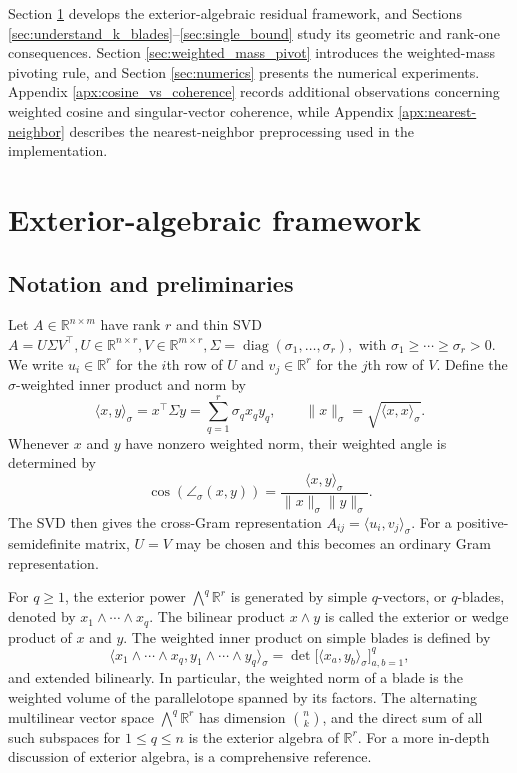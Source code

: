 \documentclass[11pt, preprint]{article}
\newcommand{\R}{\mathbb{R}}
\newcommand{\inner}[1]{\langle #1\rangle}
\begin{document}
Section \ref{sec:all_theory} develops the exterior-algebraic residual
framework, and Sections \ref{sec:understand_k_blades}--\ref{sec:single_bound}
study its geometric and rank-one consequences. Section
\ref{sec:weighted_mass_pivot} introduces the weighted-mass pivoting rule, and
Section \ref{sec:numerics} presents the numerical experiments. Appendix
\ref{apx:cosine_vs_coherence} records additional observations concerning
weighted cosine and singular-vector coherence, while Appendix
\ref{apx:nearest-neighbor} describes the nearest-neighbor preprocessing used
in the implementation.

\section{Exterior-algebraic framework}\label{sec:all_theory}

\subsection{Notation and preliminaries}\label{sec:main_res_and_prelim}

Let $A\in\R^{n\times m}$ have rank $r$ and thin SVD \( A=U\Sigma V^\top, U\in\R^{n\times r},V\in\R^{m\times r},\Sigma=\operatorname{diag}(\sigma_1,\ldots,\sigma_r), \)
with $\sigma_1\geq\cdots\geq\sigma_r>0$. We write $u_i\in\R^r$ for the $i$th row of $U$ and $v_j\in\R^r$ for the $j$th row of $V$. Define the $\sigma$-weighted inner product and norm by
\[
\inner{x,y}_\sigma=x^\top\Sigma y
=\sum_{q=1}^r\sigma_qx_qy_q,
\qquad
\|x\|_\sigma=\sqrt{\inner{x,x}_\sigma}.
\]
Whenever $x$ and $y$ have nonzero weighted norm, their weighted angle is determined by
\[
\cos(\angle_\sigma(x,y))
=\frac{\inner{x,y}_\sigma}{\|x\|_\sigma\|y\|_\sigma}.
\]
The SVD then gives the cross-Gram representation
\(
A_{ij}=\inner{u_i,v_j}_\sigma.
\) 
For a positive-semidefinite matrix, $U=V$ may be chosen and this becomes an ordinary Gram representation.

For $q\geq1$, the exterior power $\bigwedge^q\R^r$ is generated by simple $q$-vectors, or $q$-blades, denoted by \(x_1\wedge\cdots\wedge x_q.\) 
The bilinear product $x\wedge y$ is called the exterior or wedge product of $x$ and $y$. The weighted inner product on simple blades is defined by
\[
\inner{x_1\wedge\cdots\wedge x_q,
       y_1\wedge\cdots\wedge y_q}_\sigma
=
\det\!\big[\inner{x_a,y_b}_\sigma\big]_{a,b=1}^q,
\]
and extended bilinearly. In particular, the weighted norm of a blade is the weighted volume of the parallelotope spanned by its factors. The alternating multilinear vector space $\bigwedge^q \R^r$ has dimension ${n\choose k}$, and the direct sum of all such subspaces for $1\leq q\leq n$ is the exterior algebra of $\R^r$. For a more in-depth discussion of exterior algebra, \cite{Winitzki_LinearAlgebraExterior2009} is a comprehensive reference. 
\end{document}
